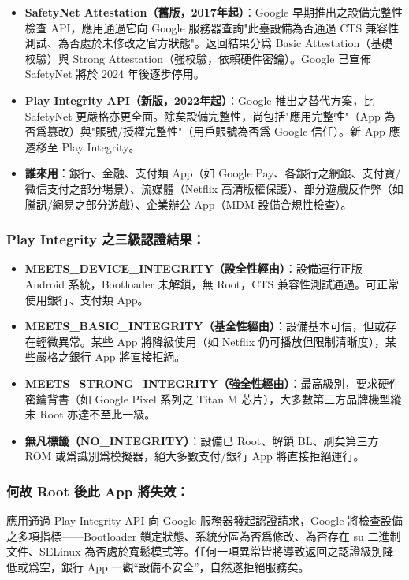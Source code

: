 \begin{itemize}
  \item \textbf{SafetyNet Attestation（舊版，2017年起）}：Google 早期推出之設備完整性檢查 API，應用通過它向 Google 服務器查詢"此臺設備為否通過 CTS 兼容性測試、為否處於未修改之官方狀態"。返回結果分爲 Basic Attestation（基礎校驗）與 Strong Attestation（強校驗，依賴硬件密鑰）。Google 已宣佈 SafetyNet 將於 2024 年後逐步停用。
  \item \textbf{Play Integrity API（新版，2022年起）}：Google 推出之替代方案，比 SafetyNet 更嚴格亦更全面。除矣設備完整性，尚包括"應用完整性"（App 為否爲篡改）與"賬號/授權完整性"（用戶賬號為否爲 Google 信任）。新 App 應遷移至 Play Integrity。
  \item \textbf{誰來用}：銀行、金融、支付類 App（如 Google Pay、各銀行之網銀、支付寶/微信支付之部分場景）、流媒體（Netflix 高清版權保護）、部分遊戲反作弊（如騰訊/網易之部分遊戲）、企業辦公 App（MDM 設備合規性檢查）。
\end{itemize}

\subsubsection*{Play Integrity 之三級認證結果：}

\begin{itemize}
  \item \textbf{MEETS\_DEVICE\_INTEGRITY（設全性經由）}：設備運行正版 Android 系統，Bootloader 未解鎖，無 Root，CTS 兼容性測試通過。可正常使用銀行、支付類 App。
  \item \textbf{MEETS\_BASIC\_INTEGRITY（基全性經由）}：設備基本可信，但或存在輕微異常。某些 App 將降級使用（如 Netflix 仍可播放但限制清晰度），某些嚴格之銀行 App 將直接拒絕。
  \item \textbf{MEETS\_STRONG\_INTEGRITY（強全性經由）}：最高級別，要求硬件密鑰背書（如 Google Pixel 系列之 Titan M 芯片），大多數第三方品牌機型縱未 Root 亦達不至此一級。
  \item \textbf{無凡標籤（NO\_INTEGRITY）}：設備已 Root、解鎖 BL、刷矣第三方 ROM 或爲識別爲模擬器，絕大多數支付/銀行 App 將直接拒絕運行。
\end{itemize}

\subsubsection*{何故 Root 後此 App 將失效：}

應用通過 Play Integrity API 向 Google 服務器發起認證請求，Google 將檢查設備之多項指標——Bootloader 鎖定狀態、系統分區為否爲修改、為否存在 su 二進制文件、SELinux 為否處於寬鬆模式等。任何一項異常皆將導致返回之認證級別降低或爲空，銀行 App 一觀“設備不安全”，自然遂拒絕服務矣。

